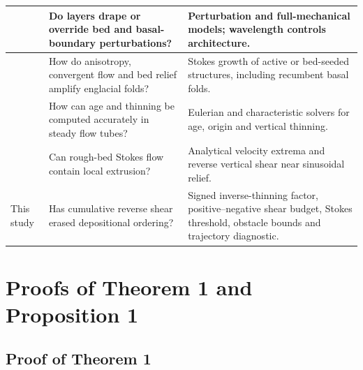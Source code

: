 \documentclass[review]{igs}
\begin{document}
\begin{longtable}{@{}p{}p{}p{}@{}}
\midrule
\citet{Hindmarsh2006} & Do layers drape or override bed and basal-boundary perturbations? & Perturbation and full-mechanical models; wavelength controls architecture. \\
\midrule
\citet{Zhang2024} & How do anisotropy, convergent flow and bed relief amplify englacial folds? & Stokes growth of active or bed-seeded structures, including recumbent basal folds. \\
\midrule
\citet{HindmarshLeysingerVieliParrenin2009,ParreninChungMartin2025} & How can age and thinning be computed accurately in steady flow tubes? & Eulerian and characteristic solvers for age, origin and vertical thinning. \\
\midrule
\citet{Gudmundsson1997linear} & Can rough-bed Stokes flow contain local extrusion? & Analytical velocity extrema and reverse vertical shear near sinusoidal relief. \\
\midrule
This study & Has cumulative reverse shear erased depositional ordering? & Signed inverse-thinning factor, positive--negative shear budget, Stokes threshold, obstacle bounds and trajectory diagnostic. \\
\end{longtable}
\endgroup

\section{Proofs of Theorem 1 and Proposition 1}
\label{app:proofs}

\subsection{Proof of Theorem 1}
\end{document}
